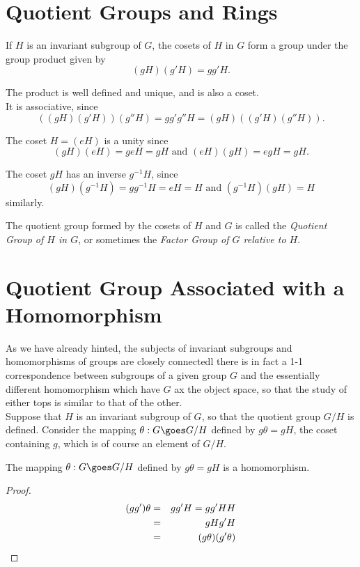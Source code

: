 \section{Quotient Groups and Rings}
\begin{theorem}
If $H$ is an invariant subgroup of $G$, the cosets of $H$ in $G$ form a group under the group product given by
\[ (gH) (g'H) = gg'H.\]
\end{theorem}
The product is well defined and unique, and is also a coset. \\

It is associative, since 
\[ ((gH)(g'H)) (g'' H) = gg'g''H = (gH)( (g'H)(g''H)).\]

The coset $H = (eH)$ is a unity since
\[ (gH) (eH) = geH =gH \mbox{   and  } (eH)(gH) = egH = gH.\]

The coset $gH$ has an inverse $g^{-1}H$, since
\[ (gH)(g^{-1}H) = gg^{-1}H = eH = H \mbox{   and   } (g^{-1}H)(gH) = H\] similarly.


The quotient group formed by the cosets of $H$ and $G$ is called the {\it Quotient Group of $H$ in $G$}, or sometimes the {\it Factor Group of $G$ relative to $H$}.

\section{Quotient Group Associated with a Homomorphism}

As we have already hinted, the subjects of invariant subgroups and homomorphisms of groups are closely connectedl there is in fact a 1-1 correspondence between subgroups of a given group $G$ and the essentially different 
homomorphism which have $G$ ax the object space, so that the study of either tops is similar to that of the other. \\

Suppose that $H$ is an invariant subgroup of $G$, so that the quotient group $G/H$ is defined. Consider the mapping $\theta: G \goes G/H$ defined by $g\theta = gH$, the coset containing $g$, which is of course an element of $G/H$.

\begin{theorem}
The mapping $\theta: G \goes G/H$ defined by $g\theta = gH$ is a homomorphism.
\end{theorem}

\begin{proof}
\begin{eqnarray*}
(gg')\theta &=& gg'H = gg' H H\cr
                &=& gH g'H \cr
                &=& (g\theta) (g'\theta)
\end{eqnarray*}
\end{proof}

